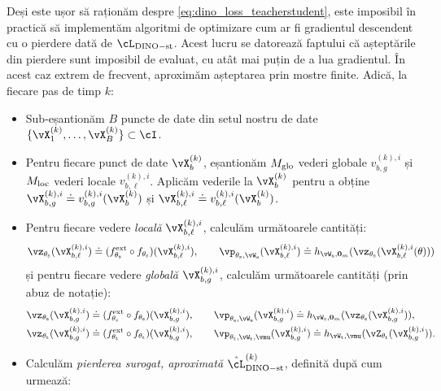 \documentclass[../../book-main_ro.tex]{subfiles}
\begin{document}
Deși este ușor să raționăm despre \eqref{eq:dino_loss_teacherstudent}, este imposibil în practică să implementăm algoritmi de optimizare cum ar fi gradientul descendent cu o pierdere dată de \(\cL_{\dino{}-\student\teacher}\). Acest lucru se datorează faptului că așteptările din pierdere sunt imposibil de evaluat, cu atât mai puțin de a lua gradientul. În acest caz extrem de frecvent, aproximăm așteptarea prin mostre finite. Adică, la fiecare pas de timp \(k\):
\begin{itemize}
    \item Sub-eșantionăm \(B\) puncte de date din setul nostru de date \(\{\vX_{1}^{(k)}, \dots, \vX_{B}^{(k)}\} \subset \cI\).
    \item Pentru fiecare punct de date \(\vX_{b}^{(k)}\), eșantionăm \(M_{\mathrm{glo}}\) vederi globale \(v_{b, g}^{(k), i}\) și \(M_{\mathrm{loc}}\) vederi locale \(v_{b, \ell}^{(k), i}\). Aplicăm vederile la \(\vX_{b}^{(k)}\) pentru a obține \(\vX_{b, g}^{(k), i} \doteq v_{b, g}^{(k), i}(\vX_{b}^{(k)})\) și \(\vX_{b, \ell}^{(k), i} \doteq v_{b, \ell}^{(k), i}(\vX_{b}^{(k)})\).
    \item Pentru fiecare vedere \textit{locală} \(\vX_{b, \ell}^{(k), i}\), calculăm următoarele cantități:
    \begin{equation}
        \vz_{\theta_{\student}}(\vX_{b, \ell}^{(k), i}) \doteq (f_{\theta_{\student}}^{\ext} \circ f_{\theta_{\student}})(\vX_{b, \ell}^{(k), i}), \qquad \vp_{\theta_{\student}, \vW_{\student}}(\vX_{b, \ell}^{(k), i}) \doteq h_{\vW_{\student}, \vzero_{m}}(\vz_{\theta_{\student}}(\vX_{b, \ell}^{(k), i}(\theta)))
    \end{equation}
    și pentru fiecare vedere \textit{globală} \(\vX_{b, g}^{(k), i}\), calculăm următoarele cantități (prin abuz de notație):
    \begin{align}
        &\vz_{\theta_{\student}}(\vX_{b, g}^{(k), i}) \doteq (f_{\theta_{\student}}^{\ext} \circ f_{\theta_{\student}})(\vX_{b, g}^{(k), i}), \qquad \vp_{\theta_{\student}, \vW_{\student}}(\vX_{b, g}^{(k), i}) \doteq h_{\vW_{\student}, \vzero_{m}}(\vz_{\theta_{\student}}(\vX_{b, g}^{(k), i})), \\
        &\vz_{\theta_{\teacher}}(\vX_{b, g}^{(k), i}) \doteq (f_{\theta_{\teacher}}^{\ext} \circ f_{\theta_{\teacher}})(\vX_{b, g}^{(k), i}), \qquad \vp_{\theta_{\teacher}, \vW_{\teacher}, \vmu}(\vX_{b, g}^{(k), i}) \doteq h_{\vW_{\teacher}, \vmu}(\vZ_{\theta_{\teacher}}(\vX_{b, g}^{(k), i})).
    \end{align}
    \item Calculăm \textit{pierderea surogat, aproximată} \(\hat{\cL}_{\dino-\student\teacher}^{(k)}\), definită după cum urmează: 

\end{itemize}
\end{document}
